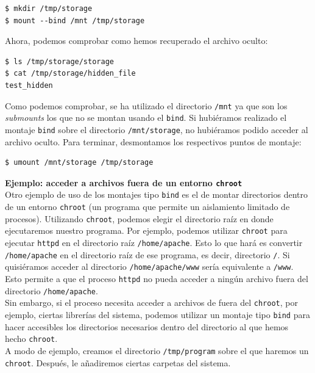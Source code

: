 \documentclass[a4paper, oneside, 12pt]{book}
\begin{document}
	\begin{verbatim}
$ mkdir /tmp/storage
$ mount --bind /mnt /tmp/storage
	\end{verbatim}

	\noindent Ahora, podemos comprobar como hemos recuperado el archivo oculto:
	
	\begin{verbatim}
$ ls /tmp/storage/storage
$ cat /tmp/storage/hidden_file
test_hidden
	\end{verbatim}

	\noindent Como podemos comprobar, se ha utilizado el directorio \texttt{/mnt} ya que son los \textit{submounts} los que no se montan usando el \texttt{bind}. Si hubiéramos realizado el montaje \texttt{bind} sobre el directorio \texttt{/mnt/storage}, no hubiéramos podido acceder al archivo oculto. Para terminar, desmontamos los respectivos puntos de montaje:
	
	\begin{verbatim}
$ umount /mnt/storage /tmp/storage
	\end{verbatim}
	
	\noindent \textbf{\large Ejemplo: acceder a archivos fuera de un entorno \texttt{chroot}}\\
	
	\noindent Otro ejemplo de uso de los montajes tipo \texttt{bind} es el de montar directorios dentro de un entorno \texttt{chroot} (un programa que permite un aislamiento limitado de procesos). Utilizando \texttt{chroot}, podemos elegir el directorio raíz en donde ejecutaremos nuestro programa. Por ejemplo, podemos utilizar \texttt{chroot} para ejecutar \texttt{httpd} en el directorio raíz \texttt{/home/apache}. Esto lo que hará es convertir \texttt{/home/apache} en el directorio raíz de ese programa, es decir, directorio \texttt{/}. Si quisiéramos acceder al directorio \texttt{/home/apache/www} sería equivalente a \texttt{/www}. Esto permite a que el proceso \texttt{httpd} no pueda acceder a ningún archivo fuera del directorio \texttt{/home/apache}. \\
	
	\noindent Sin embargo, si el proceso necesita acceder a archivos de fuera del \texttt{chroot}, por ejemplo, ciertas librerías del sistema, podemos utilizar un montaje tipo \texttt{bind} para hacer accesibles los directorios necesarios dentro del directorio al que hemos hecho \texttt{chroot}. \\
	
	\noindent A modo de ejemplo, creamos el directorio \texttt{/tmp/program} sobre el que haremos un \texttt{chroot}. Después, le añadiremos ciertas carpetas del sistema. 
	
\end{document}
